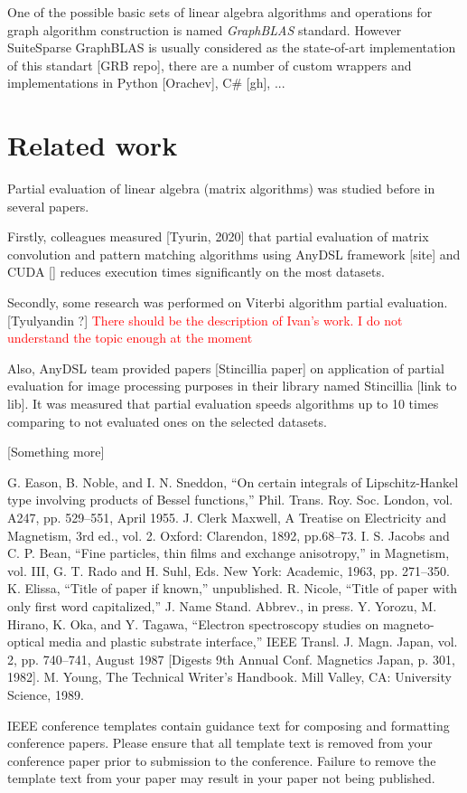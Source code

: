 \documentclass[conference]{IEEEtran}
\begin{document}
One of the possible basic sets of linear algebra algorithms and operations for graph algorithm construction is named \textit{GraphBLAS} standard. However SuiteSparse GraphBLAS is usually considered as the state-of-art implementation of this standart [GRB repo], there are a number of custom wrappers and implementations in Python [Orachev], C\# [gh], ...

\section{Related work}

Partial evaluation of linear algebra (matrix algorithms) was studied before in several papers.

Firstly, colleagues measured [Tyurin, 2020] that partial evaluation of matrix convolution and pattern matching algorithms using AnyDSL framework [site] and CUDA [] reduces execution times significantly on the most datasets.

Secondly, some research was performed on Viterbi algorithm partial evaluation. [Tyulyandin ?] \textcolor{red}{There should be the description of Ivan's work. I do not understand the topic enough at the moment}

Also, AnyDSL team provided papers [Stincillia paper] on application of partial evaluation for image processing purposes in their library named Stincillia [link to lib]. It was measured that partial evaluation speeds algorithms up to 10 times comparing to not evaluated ones on the selected datasets.

[Something more]


\begin{thebibliography}{00}
 G. Eason, B. Noble, and I. N. Sneddon, ``On certain integrals of Lipschitz-Hankel type involving products of Bessel functions,'' Phil. Trans. Roy. Soc. London, vol. A247, pp. 529--551, April 1955.
 J. Clerk Maxwell, A Treatise on Electricity and Magnetism, 3rd ed., vol. 2. Oxford: Clarendon, 1892, pp.68--73.
 I. S. Jacobs and C. P. Bean, ``Fine particles, thin films and exchange anisotropy,'' in Magnetism, vol. III, G. T. Rado and H. Suhl, Eds. New York: Academic, 1963, pp. 271--350.
 K. Elissa, ``Title of paper if known,'' unpublished.
 R. Nicole, ``Title of paper with only first word capitalized,'' J. Name Stand. Abbrev., in press.
 Y. Yorozu, M. Hirano, K. Oka, and Y. Tagawa, ``Electron spectroscopy studies on magneto-optical media and plastic substrate interface,'' IEEE Transl. J. Magn. Japan, vol. 2, pp. 740--741, August 1987 [Digests 9th Annual Conf. Magnetics Japan, p. 301, 1982].
 M. Young, The Technical Writer's Handbook. Mill Valley, CA: University Science, 1989.
\end{thebibliography}
\vspace{12pt}
\color{red}
IEEE conference templates contain guidance text for composing and formatting conference papers. Please ensure that all template text is removed from your conference paper prior to submission to the conference. Failure to remove the template text from your paper may result in your paper not being published.
\end{document}
